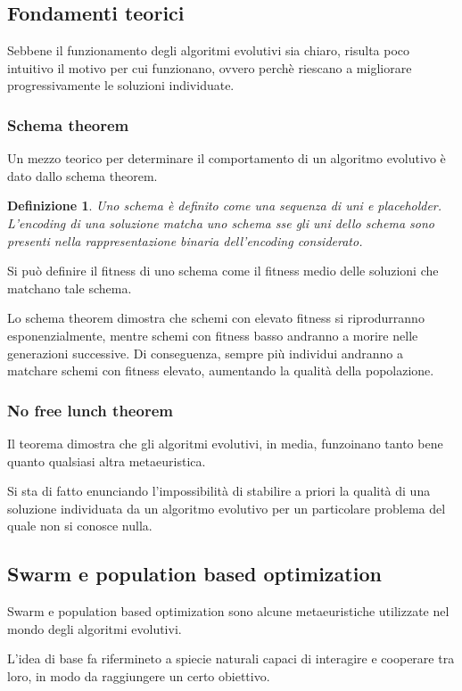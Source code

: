 \documentclass[a4paper]{article}
\newtheorem{definition}{Definizione}
\begin{document}
\subsection{Fondamenti teorici}
Sebbene il funzionamento degli algoritmi evolutivi sia chiaro, 
risulta poco intuitivo il motivo per cui funzionano, ovvero perchè riescano a 
migliorare progressivamente le soluzioni individuate.

\subsubsection{Schema theorem}
Un mezzo teorico per determinare il comportamento di un algoritmo evolutivo è dato 
dallo schema theorem.

\begin{definition}
    Uno schema è definito come una sequenza di uni e placeholder.
    L'encoding di una soluzione matcha uno schema sse gli uni dello schema sono presenti 
    nella rappresentazione binaria dell'encoding considerato.
\end{definition}

Si può definire il fitness di uno schema come il fitness medio delle soluzioni che matchano tale
schema.

Lo schema theorem dimostra che schemi con elevato fitness si riprodurranno esponenzialmente, 
mentre schemi con fitness basso andranno a morire nelle generazioni successive.
Di conseguenza, sempre più individui andranno a matchare schemi con fitness elevato, aumentando
la qualità della popolazione.

\subsubsection{No free lunch theorem}
Il teorema dimostra che gli algoritmi evolutivi, in media, funzoinano tanto bene quanto qualsiasi 
altra metaeuristica. 

Si sta di fatto enunciando l'impossibilità di stabilire a priori la qualità di una soluzione
individuata da un algoritmo evolutivo per un particolare problema del quale non si conosce nulla.

\subsection{Swarm e population based optimization}
Swarm e population based optimization sono alcune metaeuristiche utilizzate nel 
mondo degli algoritmi evolutivi.

L'idea di base fa rifermineto a spiecie naturali capaci di interagire e cooperare tra 
loro, in modo da raggiungere un certo obiettivo.
\end{document}

